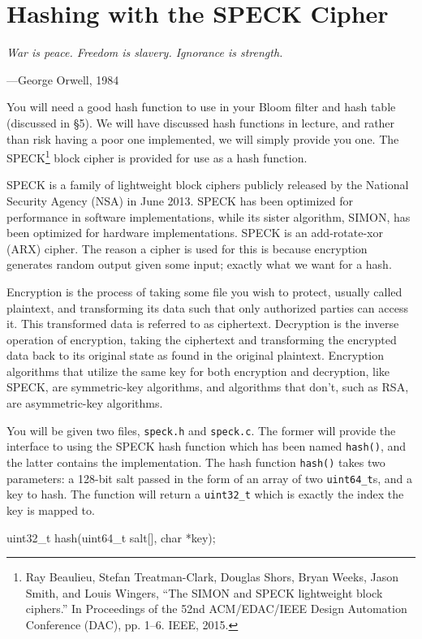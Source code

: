 \section{Hashing with the SPECK Cipher}\label{speck}

\textwidth
\epigraph{\emph{War is peace. Freedom
is slavery. Ignorance is strength.}}{---George Orwell, 1984}

\noindent
You will need a good hash function to use in your Bloom filter and hash
table (discussed in \S 5). We will have discussed hash functions in
lecture, and rather than risk having a poor one implemented, we will
simply provide you one. The SPECK\footnote{ Ray Beaulieu, Stefan
  Treatman-Clark, Douglas Shors, Bryan Weeks, Jason Smith, and Louis
Wingers, ``The {SIMON} and {SPECK} lightweight block ciphers.'' In
Proceedings of the 52nd ACM/EDAC/IEEE Design Automation Conference
(DAC), pp.  1--6. IEEE, 2015.} block cipher is provided for use as a
hash function.

SPECK is a family of lightweight block ciphers publicly released by the
National Security Agency (NSA) in June 2013.  SPECK has been optimized
for performance in software implementations, while its sister algorithm,
SIMON, has been optimized for hardware implementations. SPECK is an
add-rotate-xor (ARX) cipher. The reason a cipher is used for this is
because encryption generates random output given some input; exactly
what we want for a hash.

Encryption is the process of taking some file you wish to protect,
usually called plaintext, and transforming its data such that only
authorized parties can access it. This transformed data is referred to
as ciphertext. Decryption is the inverse operation of encryption, taking
the ciphertext and transforming the encrypted data back to its original
state as found in the original plaintext. Encryption algorithms that
utilize the same key for both encryption and decryption, like SPECK, are
symmetric-key algorithms, and algorithms that don't, such as RSA, are
asymmetric-key algorithms.

You will be given two files, \texttt{speck.h} and \texttt{speck.c}. The
former will provide the interface to using the SPECK hash function which
has been named \texttt{hash()}, and the latter contains the
implementation. The hash function \texttt{hash()} takes two parameters:
a 128-bit salt passed in the form of an array of two
\texttt{uint64\_t}s, and a key to hash. The function will return a
\texttt{uint32\_t} which is exactly the index the key is mapped to.

\begin{clisting}{}
uint32_t hash(uint64_t salt[], char *key);
\end{clisting}
